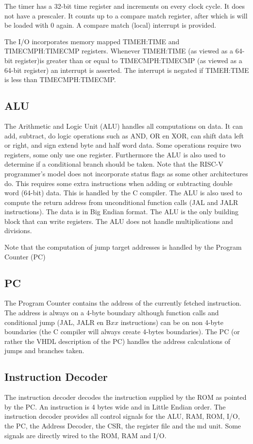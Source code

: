 \documentclass[12pt]{article}
\begin{document}
The timer has a 32-bit time register and increments on every clock cycle. It does not have a prescaler. It counts up to a compare match register, after which is will be loaded with 0 again. A compare match (local) interrupt is provided.

The I/O incorporates memory mapped TIMEH:TIME and TIMECMPH:TIMECMP registers. Whenever TIMEH:TIME (as viewed as a 64-bit register)is greater than or equal to TIMECMPH:TIMECMP (as viewed as a 64-bit register) an interrupt is asserted. The interrupt is negated if TIMEH:TIME is less than TIMECMPH:TIMECMP.

\subsection{ALU}
\label{sec:alu}
The Arithmetic and Logic Unit (ALU) handles all computations on data. It can add, subtract, do logic operations such as AND, OR en XOR, can shift data left or right, and sign extend byte and half word data. Some operations require two registers, some only use one register. Furthermore the ALU is also used to determine if a conditional branch should be taken. Note that the RISC-V programmer's model does not incorporate status flags as some other architectures do. This requires some extra instructions when adding or subtracting double word (64-bit) data. This is handled by the C compiler. The ALU is also used to compute the return address from unconditional function calls (JAL and JALR instructions). The data is in Big Endian format. The ALU is the only building block that can write registers. The ALU does not handle multiplications and divisions.

Note that the computation of jump target addresses is handled by the Program Counter (PC)

\subsection{PC}
\label{sec:pc}
The Program Counter contains the address of the currently fetched instruction. The address is always on a 4-byte boundary although function calls and conditional jump (JAL, JALR en B$xx$ instructions) can be on non 4-byte boundaries (the C compiler will always create 4-bytes boundaries). The PC (or rather the VHDL description of the PC) handles the address calculations of jumps and branches taken.

\subsection{Instruction Decoder}
\label{sec:instructiondecoder}
The instruction decoder decodes the instruction supplied by the ROM as pointed by the PC. An instruction is 4 bytes wide and in Little Endian order. The instruction decoder provides all control signals for the ALU, RAM, ROM, I/O, the PC, the Address Decoder, the CSR, the register file and the md unit. Some signals are directly wired to the ROM, RAM and I/O.
\end{document}
